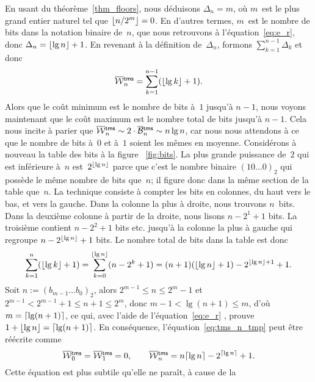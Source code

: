 En usant du théorème~\vref{thm_floors}, nous déduisons \(\Delta_n =
m\), où \(m\)~est le plus grand entier naturel tel que \(\lfloor{n/2^m}\rfloor
= 0\). En d'autres termes, \(m\)~est le nombre de bits dans la
notation binaire de~\(n\), que nous retrouvons à
l'équation~\eqref{eq:e_r}, donc \(\Delta_n = \lfloor{\lg n}\rfloor +
1\). En revenant à la définition de~\(\Delta_n\), formons
\(\sum_{k=1}^{n-1}\Delta_k\) et donc
\begin{equation}
\OW{\fun{tms}}{n} = \sum_{k=1}^{n-1}(\floor{\lg k}+1).
\label{eq:tms_n_tmp}
\end{equation}
Alors que le coût minimum est le nombre de bits à~\(1\) jusqu'à
\(n-1\), nous voyons maintenant que le coût maximum est le nombre
total de bits jusqu'à \(n-1\). Cela nous incite à parier que
\(\OW{\fun{tms}}{n} \sim 2 \cdot \OB{\fun{tms}}{n} \sim n\lg n\), car
nous nous attendons à ce que le nombre de bits à~\(0\) et à~\(1\)
soient les mêmes en moyenne. Considérons à nouveau la table des bits à
la figure \fig~\vref{fig:bits}. La plus grande puissance de~\(2\) qui
est inférieure à~\(n\) est~\(2^{\lfloor{\lg n}\rfloor}\) parce que c'est le
nombre binaire \((10\dots0)_2\) qui possède le même nombre de bits
que~\(n\); il figure donc dans la même section de la table
que~\(n\). La technique consiste à compter les bits en colonnes, du
haut vers le bas, et vers la gauche. Dans la colonne la plus à droite,
nous trouvons \(n\)~bits. Dans la deuxième colonne à partir de la
droite, nous lisons \(n-2^1+1\) bits. La troisième contient
\(n-2^2+1\) bits etc. jusqu'à la colonne la plus à gauche qui regroupe
\(n-2^{\lfloor{\lg n}\rfloor}+1\) bits. Le nombre total de bits dans la table
est donc
\begin{equation*}
\sum_{k=1}^{n}{\!(\lfloor{\lg k}\rfloor+1)}
   = \sum_{k=0}^{\lfloor{\lg n}\rfloor}{\!(n-2^k+1)}
   = (n + 1)(\lfloor{\lg n}\rfloor + 1) - 2^{\lfloor{\lg n}\rfloor+1} + 1.
\end{equation*}
Soit \(n := (b_{m-1}\dots b_0)_2\), alors \(2^{m-1} \leqslant n
\leqslant 2^m - 1\) et \(2^{m-1} < 2^{m-1} + 1 \leqslant n + 1
\leqslant 2^m\), donc \(m-1 < \lg(n+1) \leqslant m\), d'où \(m =
\lceil{\lg(n+1)}\rceil\), ce qui, avec l'aide de l'équation~\eqref{eq:e_r}
, prouve \(1 + \lfloor{\lg n}\rfloor =
\lceil{\lg(n+1)}\rceil\). En conséquence, l'équation~\eqref{eq:tms_n_tmp}
peut être réécrite comme
\begin{equation}
\OW{\fun{tms}}{0} = \OW{\fun{tms}}{1} = 0,
\qquad
\OW{\fun{tms}}{n} = n\ceiling{\lg n} - 2^{\ceiling{\lg n}} + 1.
\label{eq:top}
\end{equation}
Cette équation est plus subtile qu'elle ne paraît, à cause de la
